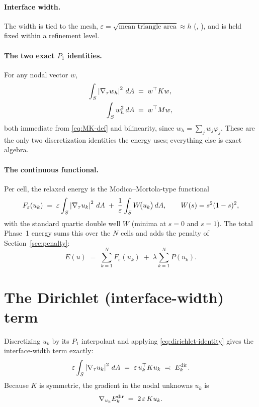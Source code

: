 \documentclass[11pt,a4paper]{article}
\begin{document}
\paragraph{Interface width.}
The width is tied to the mesh, $\varepsilon = \sqrt{\text{mean triangle area}}
\approx h$ (, ), and is
held fixed within a refinement level.

\paragraph{The two exact $P_1$ identities.}
For any nodal vector $w$,
\begin{align}
  \int_S \left|\nabla_\tau w_h\right|^2 \, dA &\;=\; w^\top K w, \label{eq:dirichlet-identity}\\
  \int_S w_h^2 \, dA &\;=\; w^\top M w, \label{eq:mass-identity}
\end{align}
both immediate from \eqref{eq:MK-def} and bilinearity, since
$w_h = \sum_j w_j \varphi_j$. These are the only two discretization identities the
energy uses; everything else is exact algebra.

\paragraph{The continuous functional.}
Per cell, the relaxed energy is the Modica--Mortola-type functional
\begin{equation}
  F_\varepsilon(u_k)
  \;=\;
  \varepsilon \int_S \left|\nabla_\tau u_k\right|^2 \, dA
  \;+\;
  \frac{1}{\varepsilon} \int_S W\!\big(u_k\big)\, dA,
  \qquad
  W(s) = s^2 (1-s)^2,
  \label{eq:continuous-Feps}
\end{equation}
with the standard quartic double well $W$ (minima at $s=0$ and $s=1$). The total
Phase~1 energy sums this over the $N$ cells and adds the penalty of
Section~\ref{sec:penalty}:
\begin{equation}
  E(u) \;=\; \sum_{k=1}^{N} F_\varepsilon(u_k) \;+\; \lambda \sum_{k=1}^{N} P(u_k).
  \label{eq:total-continuous}
\end{equation}

\section{The Dirichlet (interface-width) term}
\label{sec:dirichlet}

Discretizing $u_k$ by its $P_1$ interpolant and applying
\eqref{eq:dirichlet-identity} gives the interface-width term exactly:
\begin{equation}
  \varepsilon \int_S \left|\nabla_\tau u_k\right|^2 \, dA
  \;=\;
  \varepsilon \, u_k^\top K u_k
  \;=\!:\; E^{\mathrm{dir}}_k .
  \label{eq:dirichlet-term}
\end{equation}
Because $K$ is symmetric, the gradient in the nodal unknowns $u_k$ is
\begin{equation}
  \nabla_{u_k} E^{\mathrm{dir}}_k \;=\; 2\,\varepsilon \, K u_k .
  \label{eq:dirichlet-grad}
\end{equation}
\end{document}
